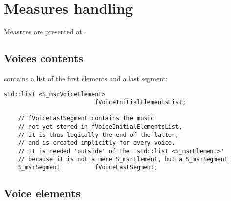 



\chapter{Measures handling}\label{Measures handling}

Measures are presented at .


\section{Voices contents}

 contains a list of the first elements and a last segment:
\begin{lstlisting}[language=CPlusPlus]
    std::list <S_msrVoiceElement>
                          fVoiceInitialElementsList;

    // fVoiceLastSegment contains the music
    // not yet stored in fVoiceInitialElementsList,
    // it is thus logically the end of the latter,
    // and is created implicitly for every voice.
    // It is needed 'outside' of the 'std::list <S_msrElement>'
    // because it is not a mere S_msrElement, but a S_msrSegment
    S_msrSegment          fVoiceLastSegment;
\end{lstlisting}


\section{Voice elements}

